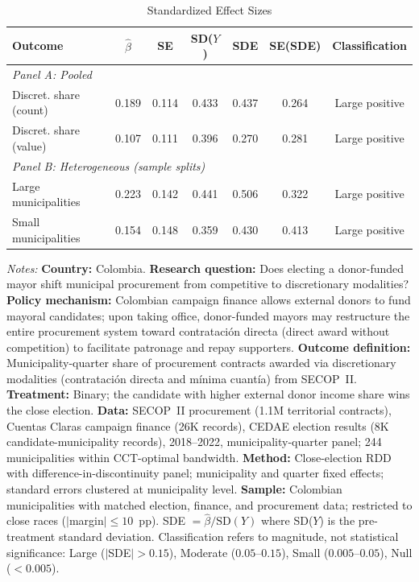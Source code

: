 \begin{table}[t]
\centering
\begin{threeparttable}
\caption{Standardized Effect Sizes}
\label{tab:sde}
\begin{tabular}{lcccccc}
\hline\hline
Outcome & $\hat{\beta}$ & SE & SD($Y$) & SDE & SE(SDE) & Classification \\
\hline
\multicolumn{7}{l}{\textit{Panel A: Pooled}} \\
Discret. share (count) & 0.189 & 0.114 & 0.433 & 0.437 & 0.264 & Large positive \\
Discret. share (value) & 0.107 & 0.111 & 0.396 & 0.270 & 0.281 & Large positive \\
\hline
\multicolumn{7}{l}{\textit{Panel B: Heterogeneous (sample splits)}} \\
Large municipalities & 0.223 & 0.142 & 0.441 & 0.506 & 0.322 & Large positive \\
Small municipalities & 0.154 & 0.148 & 0.359 & 0.430 & 0.413 & Large positive \\
\hline\hline
\end{tabular}
\begin{tablenotes}[flushleft]
\item \textit{Notes:} \textbf{Country:} Colombia. \textbf{Research question:} Does electing a donor-funded mayor shift municipal procurement from competitive to discretionary modalities? \textbf{Policy mechanism:} Colombian campaign finance allows external donors to fund mayoral candidates; upon taking office, donor-funded mayors may restructure the entire procurement system toward contrataci\'on directa (direct award without competition) to facilitate patronage and repay supporters. \textbf{Outcome definition:} Municipality-quarter share of procurement contracts awarded via discretionary modalities (contrataci\'on directa and m\'inima cuant\'ia) from SECOP~II. \textbf{Treatment:} Binary; the candidate with higher external donor income share wins the close election. \textbf{Data:} SECOP~II procurement (1.1M territorial contracts), Cuentas Claras campaign finance (26K records), CEDAE election results (8K candidate-municipality records), 2018--2022, municipality-quarter panel; 244 municipalities within CCT-optimal bandwidth. \textbf{Method:} Close-election RDD with difference-in-discontinuity panel; municipality and quarter fixed effects; standard errors clustered at municipality level. \textbf{Sample:} Colombian municipalities with matched election, finance, and procurement data; restricted to close races ($|$margin$| \leq 10$~pp). SDE $= \hat{\beta} / \text{SD}(Y)$ where SD($Y$) is the pre-treatment standard deviation. Classification refers to magnitude, not statistical significance: Large ($|$SDE$| > 0.15$), Moderate ($0.05$--$0.15$), Small ($0.005$--$0.05$), Null ($< 0.005$).
\end{tablenotes}
\end{threeparttable}
\end{table}

